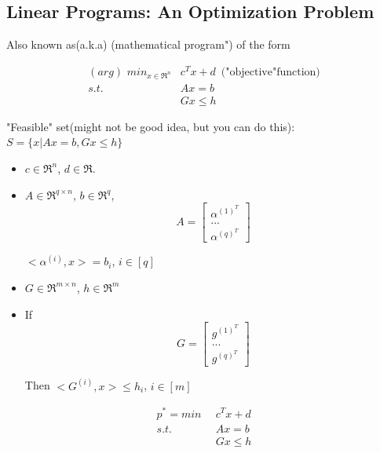 \subsection{Linear Programs: An Optimization Problem}

Also known as(a.k.a) (mathematical program") of the form

\begin{align*}
(arg)\,\,min_{x\in \Re^n}&c^Tx + d\,\,\,\text{("objective"function)}\\
s.t.\,\,\, &Ax = b\\
&Gx \leq h
\end{align*}

"Feasible" set(might not be good idea, but you can do this): $S = \{x|Ax = b, Gx \leq h \}$


\begin{itemize}
	\item $c\in \Re^n$, $d\in \Re$.
	
	\item $A\in \Re^{q\times n}$, $b\in \Re^q$, \begin{equation*}
	A = 
	\begin{bmatrix}
	\alpha^{(1)^T}\\
	...\\
	\alpha^{(q)^T}
	\end{bmatrix}
	\end{equation*}
	
	$<\alpha^{(i)}, x> =b_i$, $i\in \left[q\right]$
	
	\item $G\in \Re^{m\times n}$, $h\in \Re^m$
	
	\item If
	\begin{equation*}
	G = 
	\begin{bmatrix}
	g^{(1)^T}\\
	...\\
	g^{(q)^T}
	\end{bmatrix}
	\end{equation*}
	
	Then $<G^{(i)}, x>\leq h_i$, $i\in \left[m\right]$
	
\end{itemize}





\begin{align*}
p^* = min \,\,\, &c^Tx + d\\
s.t.\,\,\, &Ax = b\\
&Gx\leq h
\end{align*}

